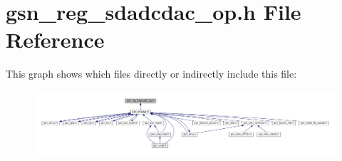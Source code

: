 \hypertarget{a00568}{
\section{gsn\_\-reg\_\-sdadcdac\_\-op.h File Reference}
\label{a00568}
}
This graph shows which files directly or indirectly include this file:
\nopagebreak
\begin{figure}[H]
\begin{center}
\leavevmode
\includegraphics[width=400pt]{a00805}
\end{center}
\end{figure}
